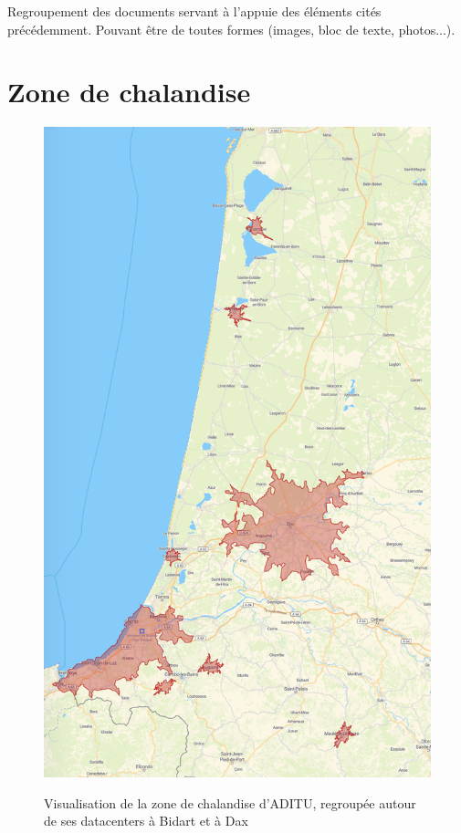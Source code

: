 
Regroupement des documents servant à l'appuie des éléments cités précédemment. Pouvant être de toutes formes (images, bloc de texte, photos...).

\section{Zone de chalandise}

\begin{figure}[H]
    \centering
    \includegraphics[width=\textwidth - \textwidth / 5]{zone_chalandise_aditu.png}
    \figurename
    \caption{Visualisation de la zone de chalandise d'ADITU, regroupée autour de ses datacenters à Bidart et à Dax}
    \label{fig:zone_chalandise}
\end{figure}


